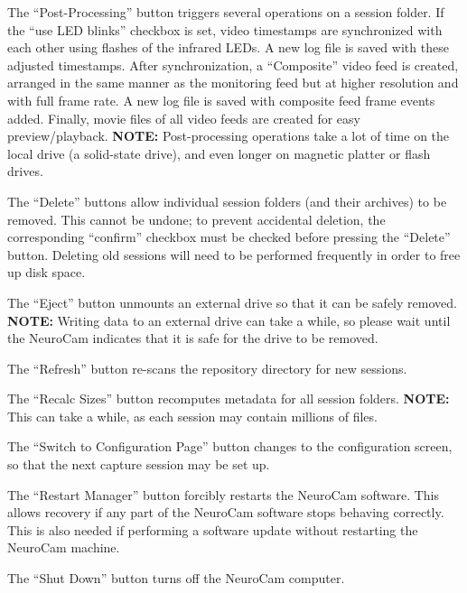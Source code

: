 The ``Post-Processing'' button triggers several operations on a session 
folder. If the ``use LED blinks'' checkbox is set, video timestamps are
synchronized with each other using flashes of the infrared LEDs. A new log
file is saved with these adjusted timestamps. After synchronization, a
``Composite'' video feed is created, arranged in the same manner as the 
monitoring feed but at higher resolution and with full frame rate. A new log
file is saved with composite feed frame events added. Finally, movie files
of all video feeds are created for easy preview/playback.
\textbf{NOTE:} Post-processing operations take a lot of time on the local
drive (a solid-state drive), and even longer on magnetic platter or flash
drives.


The ``Delete'' buttons allow individual session folders (and their archives)
to be removed. This cannot be undone; to prevent accidental deletion, the
corresponding ``confirm'' checkbox must be checked before pressing the
``Delete'' button. Deleting old sessions will need to be performed frequently
in order to free up disk space.

The ``Eject'' button unmounts an external drive so that it can be safely
removed. \textbf{NOTE:} Writing data to an external drive can take a while,
so please wait until the NeuroCam indicates that it is safe for the drive
to be removed.

The ``Refresh'' button re-scans the repository directory for new sessions.

The ``Recalc Sizes'' button recomputes metadata for all session folders.
\textbf{NOTE:} This can take a while, as each session may contain millions
of files.

The ``Switch to Configuration Page'' button changes to the configuration
screen, so that the next capture session may be set up.

The ``Restart Manager'' button forcibly restarts the NeuroCam software. This
allows recovery if any part of the NeuroCam software stops behaving correctly.
This is also needed if performing a software update without restarting the
NeuroCam machine.

The ``Shut Down'' button turns off the NeuroCam computer.

%
